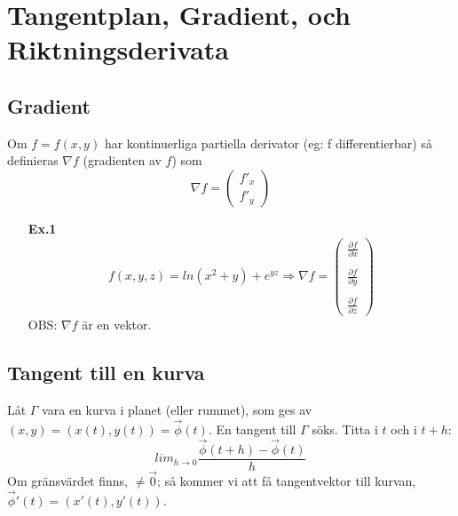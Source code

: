 \documentclass[a4paper,12pt]{article}
\newcommand{\partialfrac}[2]{\frac{\partial #1}{\partial #2}}
\begin{document}
\section{Tangentplan, Gradient, och Riktningsderivata}
\subsection{Gradient}
Om $f=f(x,y)$ har kontinuerliga partiella derivator (eg: f differentierbar)
så definieras $\nabla f$ (gradienten av $f$) som
\begin{equation*}
  \nabla f = \begin{pmatrix}
               f'_x\\
               f'_y
             \end{pmatrix}
\end{equation*}

\begin{itemize}
\item[\textbf{Ex.1}]
  \begin{equation*}
    f(x,y,z) = ln(x^2+y)+e^{yz} \Rightarrow \nabla f =
    \begin{pmatrix}
      \partialfrac{f}{x}\\\\
      \partialfrac{f}{y}\\\\
      \partialfrac{f}{z}
    \end{pmatrix}
  \end{equation*}
  OBS: $\nabla f$ är en vektor.
\end{itemize}

\subsection{Tangent till en kurva}
Låt $\Gamma$ vara en kurva i planet (eller rummet), som ges av
$(x,y) = (x(t),y(t)) = \vec{\phi}(t)$. En tangent till $\Gamma$ söks.
Titta i $t$ och i $t+h$:
\begin{equation*}
  lim_{h \to 0}\frac{\vec{\phi}(t+h)-\vec{\phi}(t)}{h}
\end{equation*}
Om gränsvärdet finns, $\neq\vec{0}$; så kommer vi att få tangentvektor till
kurvan, $\vec{\phi}'(t) = (x'(t),y'(t))$.
\end{document}

